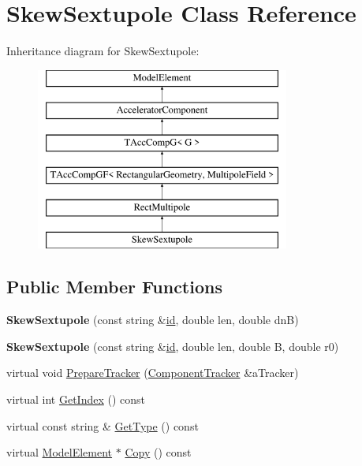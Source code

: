 \hypertarget{classSkewSextupole}{}\section{Skew\+Sextupole Class Reference}
\label{classSkewSextupole}
Inheritance diagram for Skew\+Sextupole\+:\begin{figure}[H]
\begin{center}
\leavevmode
\includegraphics[height=6.000000cm]{classSkewSextupole}
\end{center}
\end{figure}
\subsection*{Public Member Functions}
\begin{DoxyCompactItemize}
\item 
\mbox{\label{classSkewSextupole_a2fbe09d10c98d7ab2e28931591990779}} 
{\bfseries Skew\+Sextupole} (const string \&\hyperlink{classModelElement_aada171ead2085c75b592cf07d91bc5c2}{id}, double len, double dnB)
\item 
\mbox{\label{classSkewSextupole_a63bf0dce0229e01165a7cba2a19e4214}} 
{\bfseries Skew\+Sextupole} (const string \&\hyperlink{classModelElement_aada171ead2085c75b592cf07d91bc5c2}{id}, double len, double B, double r0)
\item 
virtual void \hyperlink{classSkewSextupole_a8700a80f9f1863d5f6966cf0827ed342}{Prepare\+Tracker} (\hyperlink{classComponentTracker}{Component\+Tracker} \&a\+Tracker)
\item 
virtual int \hyperlink{classSkewSextupole_a8dbbf55904005b051ad5d84a9140ab10}{Get\+Index} () const
\item 
virtual const string \& \hyperlink{classSkewSextupole_ae10ab2f55d9cf84bdab2cb2f707c8758}{Get\+Type} () const
\item 
virtual \hyperlink{classModelElement}{Model\+Element} $\ast$ \hyperlink{classSkewSextupole_ac580c5b90fa653d51fd2f7288d65a9c7}{Copy} () const
\end{DoxyCompactItemize}

